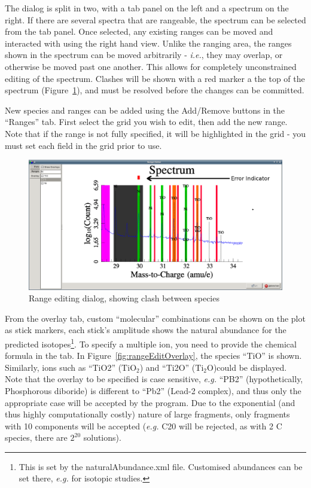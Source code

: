 \documentclass[10pt]{article}
\begin{document}
The dialog is split in two, with a tab panel on the left and a spectrum on the right. If there are several spectra that are rangeable, the spectrum can be selected from the tab panel. Once selected, any existing ranges can be moved and interacted with using the right hand view. Unlike the ranging area, the ranges shown in the spectrum can be moved arbitrarily - \emph{i.e.}, they may overlap, or otherwise be moved past one another. This allows for completely unconstrained editing of the spectrum. Clashes will be shown with a red marker a the top of the spectrum (Figure~\ref{fig:rangeEditClash}), and must be resolved before the changes can be committed.

New species and ranges can be added using the Add/Remove buttons in the ``Ranges'' tab. First select the grid you wish to edit, then add the new range. Note that if the range is not fully specified, it will be highlighted in the grid - you must set each field in the grid prior to use. 


\begin{figure}
\begin{center}
 \includegraphics[width=0.9 \textwidth,keepaspectratio=true]{./figures/rangeedit-clash.png}
 \caption{Range editing dialog, showing clash between species}
\label{fig:rangeEditClash}
\end{center}
\end{figure}


From the overlay tab, custom ``molecular'' combinations can be shown on the plot as stick markers, each stick's amplitude shows the natural abundance for the predicted isotopes\footnote{This is set by the naturalAbundance.xml file. Customised abundances can be set there, \emph{e.g.} for isotopic studies.}. To specify a multiple ion, you need to provide the chemical formula in the tab. In Figure~\ref{fig:rangeEditOverlay}, the species ``TiO'' is shown. Similarly, ions such as ``TiO2'' ($\mathrm{TiO}_2$) and ``Ti2O'' ($\mathrm{Ti}_2\mathrm{O}$)could be displayed. Note that the overlay to be specified is case sensitive, \emph{e.g.} ``PB2'' (hypothetically, Phosphorous diboride) is different to ``Pb2'' (Lead-2 complex), and thus only the appropriate case will be accepted by the program. Due to the exponential (and thus highly computationally costly) nature of large fragments, only fragments with 10 components will be accepted (\emph{e.g.} C20 will be rejected, as with 2 C species, there are $2^{20}$ solutions).
\end{document}

